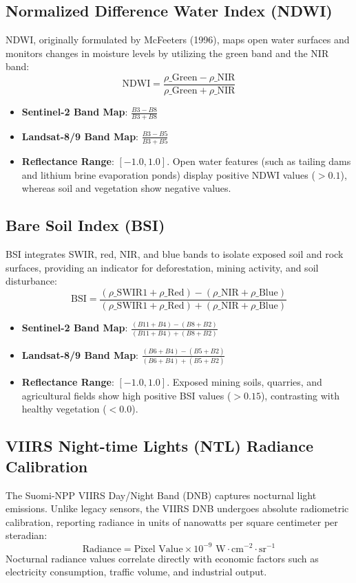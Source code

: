 \subsection{Normalized Difference Water Index (NDWI)}
NDWI, originally formulated by McFeeters (1996), maps open water surfaces and monitors changes in moisture levels by utilizing the green band and the NIR band:
$$\text{NDWI} = \frac{\rho\_{\text{Green}} - \rho\_{\text{NIR}}}{\rho\_{\text{Green}} + \rho\_{\text{NIR}}}$$
\begin{itemize}
  \item \textbf{Sentinel-2 Band Map}: $\frac{B3 - B8}{B3 + B8}$
  \item \textbf{Landsat-8/9 Band Map}: $\frac{B3 - B5}{B3 + B5}$
  \item \textbf{Reflectance Range}: $[-1.0, 1.0]$. Open water features (such as tailing dams and lithium brine evaporation ponds) display positive NDWI values ($>0.1$), whereas soil and vegetation show negative values.

\end{itemize}
\subsection{Bare Soil Index (BSI)}
BSI integrates SWIR, red, NIR, and blue bands to isolate exposed soil and rock surfaces, providing an indicator for deforestation, mining activity, and soil disturbance:
$$\text{BSI} = \frac{(\rho\_{\text{SWIR1}} + \rho\_{\text{Red}}) - (\rho\_{\text{NIR}} + \rho\_{\text{Blue}})}{(\rho\_{\text{SWIR1}} + \rho\_{\text{Red}}) + (\rho\_{\text{NIR}} + \rho\_{\text{Blue}})}$$
\begin{itemize}
  \item \textbf{Sentinel-2 Band Map}: $\frac{(B11 + B4) - (B8 + B2)}{(B11 + B4) + (B8 + B2)}$
  \item \textbf{Landsat-8/9 Band Map}: $\frac{(B6 + B4) - (B5 + B2)}{(B6 + B4) + (B5 + B2)}$
  \item \textbf{Reflectance Range}: $[-1.0, 1.0]$. Exposed mining soils, quarries, and agricultural fields show high positive BSI values ($>0.15$), contrasting with healthy vegetation ($<0.0$).

\end{itemize}
\subsection{VIIRS Night-time Lights (NTL) Radiance Calibration}
The Suomi-NPP VIIRS Day/Night Band (DNB) captures nocturnal light emissions. Unlike legacy sensors, the VIIRS DNB undergoes absolute radiometric calibration, reporting radiance in units of nanowatts per square centimeter per steradian:
$$\text{Radiance} = \text{Pixel Value} \times 10^{-9} \text{ W}\cdot\text{cm}^{-2}\cdot\text{sr}^{-1}$$
Nocturnal radiance values correlate directly with economic factors such as electricity consumption, traffic volume, and industrial output.

